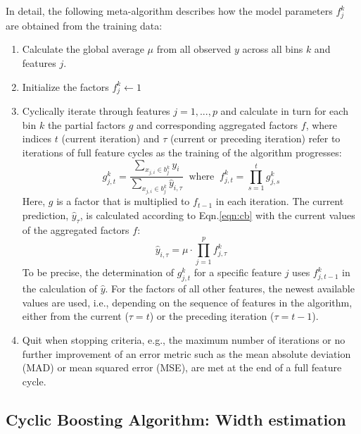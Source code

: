 \documentclass[BCOR=1mm, DIV=calc,10pt,
twoside=true,
twocolumn,
headings=normal]{scrartcl}
\newcommand{\eqn}{Eqn.}
\begin{document}
In detail, the following meta-algorithm describes how the model parameters $f^k_j$ are obtained from the training data:
\begin{enumerate}
\item{Calculate the global average $\mu$ from all observed $y$ across all bins $k$ and features $j$.}
\item{Initialize the factors $f^k_j \leftarrow 1$}
\item{Cyclically iterate through features $j = 1,...,p $ and calculate in turn for each bin $k$ the partial factors $g$ and corresponding aggregated factors $f$, where indices $t$ (current iteration) and $\tau$ (current or preceding iteration) refer to iterations of full feature cycles as the training of the algorithm progresses:
\begin{equation} \label{factors}
g^k_{j,t} = \frac{\sum \limits_{x_{j,i} \in b^k_j} y_i}{\sum \limits_{x_{j,i} \in b^k_j} \hat{y}_{i,\tau}}\;\; \mathrm{where} \; \; f^k_{j,t} = \prod \limits_{s=1}^t g^k_{j,s}
\end{equation}
Here,  $g$ is a factor that is multiplied to $f_{t-1}$ in each iteration. The current prediction, $\hat{y}_\tau$, is calculated according to \eqn \eqref{eqn:cb} with the current values of the aggregated factors $f$:
\begin{equation} \label{factors3}
\hat{y}_{i,\tau} = \mu \cdot \prod \limits_{j=1}^p f^k_{j,\tau}
\end{equation}
To be precise, the determination of $g^k_{j,t}$ for a specific feature $j$ uses $f^k_{j,t-1}$ in the calculation of $\hat{y}$. For the factors of all other features, the newest available values are used, i.e., depending on the sequence of features in the algorithm, either from the current ($\tau=t$) or the preceding iteration ($\tau=t-1$).}
\item{Quit when stopping criteria, e.g., the maximum number of iterations or no further improvement of an error metric such as the mean absolute deviation (MAD) or mean squared error (MSE), are met at the end of a full feature cycle.}
\end{enumerate}

\subsection{Cyclic Boosting Algorithm: Width estimation}
\label{sec:cb_width}
\end{document}
